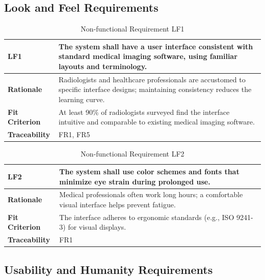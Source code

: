 \documentclass[12pt]{article}
\begin{document}
\subsection{Look and Feel Requirements}

\begin{table}[h!]
\centering
{}
\begin{tabular}{|p{3.5cm}|p{11.5cm}|}
\hline
\rowcolor{gray!30}
\textbf{LF1} & The system shall have a user interface consistent with standard medical imaging software, using familiar layouts and terminology. \\
\hline
\textbf{Rationale} & Radiologists and healthcare professionals are accustomed to specific interface designs; maintaining consistency reduces the learning curve. \\
\hline
\textbf{Fit Criterion} & At least 90\% of radiologists surveyed find the interface intuitive and comparable to existing medical imaging software. \\
\hline
\textbf{Traceability} & FR1, FR5 \\
\hline
\end{tabular}
\caption{Non-functional Requirement LF1}
\end{table}

\begin{table}[h!]
\centering
{}
\begin{tabular}{|p{3.5cm}|p{11.5cm}|}
\hline
\rowcolor{gray!30}
\textbf{LF2} & The system shall use color schemes and fonts that minimize eye strain during prolonged use. \\
\hline
\textbf{Rationale} & Medical professionals often work long hours; a comfortable visual interface helps prevent fatigue. \\
\hline
\textbf{Fit Criterion} & The interface adheres to ergonomic standards (e.g., ISO 9241-3) for visual displays. \\
\hline
\textbf{Traceability} & FR1 \\
\hline
\end{tabular}
\caption{Non-functional Requirement LF2}
\end{table}
\clearpage
\subsection{Usability and Humanity Requirements}
\end{document}
